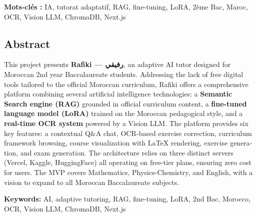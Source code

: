 \documentclass[12pt,a4paper]{report}
\begin{document}
\vspace{0.5cm}
\textbf{Mots-clés :} IA, tutorat adaptatif, RAG, fine-tuning, LoRA, 2ème Bac, Maroc, OCR, Vision LLM, ChromaDB, Next.js

\begin{otherlanguage}{english}
\chapter*{Abstract}

This project presents \textbf{Rafiki — رفيقي}, an adaptive AI tutor designed for Moroccan 2nd year Baccalaureate students. Addressing the lack of free digital tools tailored to the official Moroccan curriculum, Rafiki offers a comprehensive platform combining several artificial intelligence technologies: a \textbf{Semantic Search engine (RAG)} grounded in official curriculum content, a \textbf{fine-tuned language model (LoRA)} trained on the Moroccan pedagogical style, and a \textbf{real-time OCR system} powered by a Vision LLM. The platform provides six key features: a contextual Q\&A chat, OCR-based exercise correction, curriculum framework browsing, course visualization with LaTeX rendering, exercise generation, and exam generation. The architecture relies on three distinct servers (Vercel, Kaggle, HuggingFace) all operating on free-tier plans, ensuring zero cost for users. The MVP covers Mathematics, Physics-Chemistry, and English, with a vision to expand to all Moroccan Baccalaureate subjects.

\vspace{0.5cm}
\textbf{Keywords:} AI, adaptive tutoring, RAG, fine-tuning, LoRA, 2nd Bac, Morocco, OCR, Vision LLM, ChromaDB, Next.js
\end{otherlanguage}

\tableofcontents
\newpage

\listoffigures
{}
\listoftables
{}
\newpage

\end{document}
